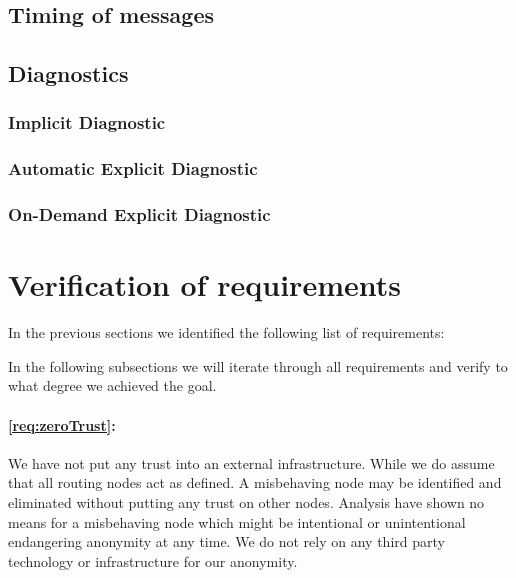 \subsection{Timing of messages}

\subsection{Diagnostics}


\subsubsection{Implicit Diagnostic}

\subsubsection{Automatic Explicit Diagnostic}

\subsubsection{On-Demand Explicit Diagnostic}

\section{Verification of requirements}
In the previous sections we identified the following list of requirements:

\slistofrequirements

In the following subsections we will iterate through all requirements and verify to what degree we achieved the goal.


\paragraph*{\ref{req:zeroTrust}:} 
We have not put any trust into an external infrastructure. While we do assume that all routing nodes act as defined. A misbehaving node may be identified and eliminated without putting any trust on other nodes. Analysis have shown no means for a misbehaving node which might be intentional or unintentional endangering anonymity at any time. We do not rely on any third party technology or infrastructure for our anonymity. 

